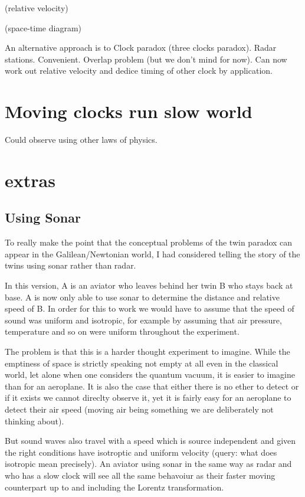 \documentclass[a4paper]{report}
\begin{document}
(relative velocity)

(space-time diagram)



An alternative approach is to  Clock paradox (three clocks paradox). Radar stations. Convenient. Overlap problem (but we don't mind for now). Can now work out relative velocity and dedice timing of other clock by application.



\section*{Moving clocks run slow world}
Could observe using other laws of physics.
\section*{extras}


\subsection*{Using Sonar}
To really make the point that the conceptual problems of the twin paradox can appear in the Galilean/Newtonian world, I had considered telling the story of the twins using sonar rather than radar.

In this version, A is an aviator who leaves behind her twin B who stays back at base. A is now only able to use sonar to determine the distance and relative speed of B. In order for this to work we would have to assume that the speed of sound was uniform and isotropic, for example by assuming that air pressure, temperature and so on were uniform throughout the experiment.

The problem is that this is a harder thought experiment to imagine. While the emptiness of space is strictly speaking not empty at all even in the classical world, let alone when one considers the quantum vacuum, it is easier to imagine than for an aeroplane. It is also the case that either there is no ether to detect or if it exists we cannot direclty observe it, yet it is fairly easy for an aeroplane to detect their air speed (moving air being something we are deliberately not thinking about).

But sound waves also travel with a speed which is source independent and given the right conditions have isotroptic and uniform velocity (query: what does isotropic mean precisely). An aviator using sonar in the same way as radar and who has a slow clock will see all the same behavoiur as their faster moving counterpart up to and including the Lorentz transformation. 
\end{document}
